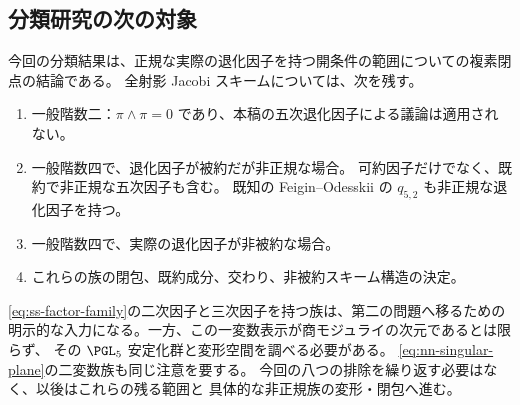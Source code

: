 \subsection{分類研究の次の対象}
今回の分類結果は、正規な実際の退化因子を持つ開条件の範囲についての複素閉点の結論である。
全射影 Jacobi スキームについては、次を残す。
\begin{enumerate}
\item 一般階数二：$\pi\wedge\pi=0$ であり、本稿の五次退化因子による議論は適用されない。
\item 一般階数四で、退化因子が被約だが非正規な場合。
可約因子だけでなく、既約で非正規な五次因子も含む。
既知の Feigin--Odesskii の $q_{5,2}$ も非正規な退化因子を持つ\cite{Pym}。
\item 一般階数四で、実際の退化因子が非被約な場合。
\item これらの族の閉包、既約成分、交わり、非被約スキーム構造の決定。
\end{enumerate}
\eqref{eq:ss-factor-family}の二次因子と三次因子を持つ族は、第二の問題へ移るための
明示的な入力になる。一方、この一変数表示が商モジュライの次元であるとは限らず、
その $\PGL_5$ 安定化群と変形空間を調べる必要がある。
\eqref{eq:nn-singular-plane}の二変数族も同じ注意を要する。
今回の八つの排除を繰り返す必要はなく、以後はこれらの残る範囲と
具体的な非正規族の変形・閉包へ進む。
